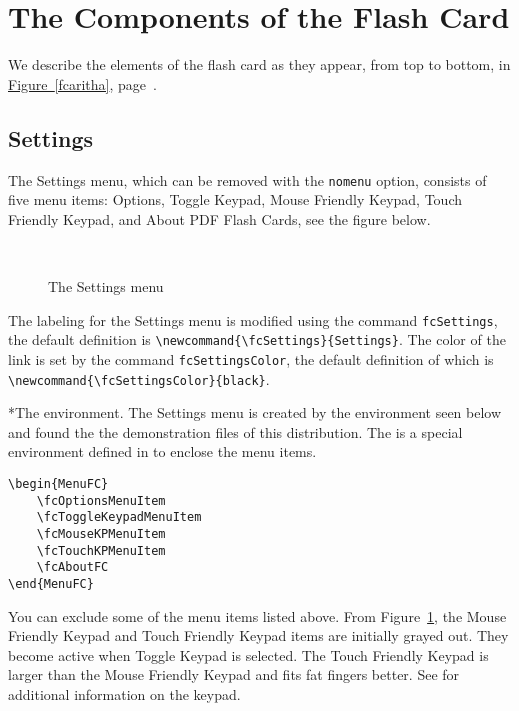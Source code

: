 \documentclass{article}
\makeatletter
\let\uif\textsf
\newcommand{\sprodName}{\textsf{Flash Card}}
\let\bslash=\@backslashchar
\renewcommand{\paragraph}{\@startsection{paragraph}{4}{0pt}{6pt}{-3pt}{\bfseries}}
\def\cs#1{\texttt{\bslash#1}}
\makeatother
\begin{document}
\section{The Components of the \sprodName}

We describe the elements of the flash card as they appear, from top to
bottom, in \hyperref[fcaritha]{Figure~\ref*{fcaritha}},
page~\pageref*{fcaritha}.

\subsection{Settings}\label{settings}

The \uif{Settings} menu, which can be removed with the
\texttt{nomenu} option, consists of five menu items:
\uif{Options}, \uif{Toggle Keypad},
\uif{Mouse Friendly Keypad}, \uif{Touch Friendly
Keypad}, and \uif{About PDF Flash Cards}, see the figure below.

\begin{figure}[htb]
\begin{center}\setlength{\fboxsep}{0pt}
\\
\caption{The \texorpdfstring{\protect\uif{Settings}}{Settings} menu}\label{menuSettings}
\end{center}
\end{figure}

The labeling for the \uif{Settings} menu is modified using the
command \cs{fcSettings}, the default definition is
\verb!\newcommand{\fcSettings}{Settings}!. The color of the link is set by
the command \cs{fcSettingsColor}, the default definition of which is
\verb!\newcommand{\fcSettingsColor}{black}!.

\paragraph*{The  environment.} The \uif{Settings} menu is created by the environment seen below and found the
the demonstration files of this distribution. The  is a special environment
defined in  to enclose the menu items.
\begin{Verbatim}[xleftmargin=\amtIndent]
\begin{MenuFC}
    \fcOptionsMenuItem
    \fcToggleKeypadMenuItem
    \fcMouseKPMenuItem
    \fcTouchKPMenuItem
    \fcAboutFC
\end{MenuFC}
\end{Verbatim}
You can exclude some of the menu items listed above. From
Figure~\ref{menuSettings}, the \uif{Mouse Friendly Keypad} and
\uif{Touch Friendly Keypad} items are initially grayed out. They
become active when \uif{Toggle Keypad} is selected. The
\uif{Touch Friendly Keypad} is larger than the
\uif{Mouse Friendly Keypad} and fits fat fingers better. See
 for additional information on the keypad.
\end{document}
